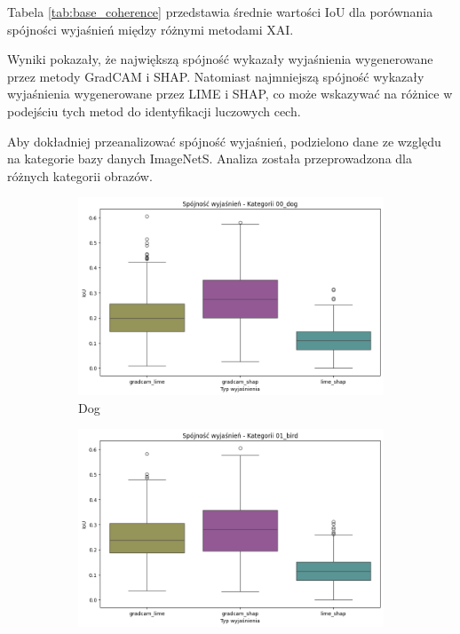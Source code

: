 Tabela \ref{tab:base_coherence} przedstawia średnie wartości IoU dla porównania spójności wyjaśnień między różnymi metodami XAI.

Wyniki pokazały, że największą spójność wykazały wyjaśnienia wygenerowane przez metody GradCAM i SHAP.
Natomiast najmniejszą spójność wykazały wyjaśnienia wygenerowane przez LIME i SHAP, co może wskazywać na różnice w podejściu tych metod do identyfikacji luczowych cech.

Aby dokładniej przeanalizować spójność wyjaśnień, podzielono dane ze względu na kategorie bazy danych ImageNetS.
Analiza została przeprowadzona dla różnych kategorii obrazów.

\begin{figure}
	\centering
	\begin{subfigure}[b]{0.3\textwidth}
		\includegraphics[width=.9\textwidth]{img/base_coherence_dog}
		\caption{Dog}  \label{}
	\end{subfigure}
	\begin{subfigure}[b]{0.3\textwidth}
		\centering\includegraphics[width=.9\textwidth]{img/base_coherence_bird}

\end{subfigure}
\end{figure}
